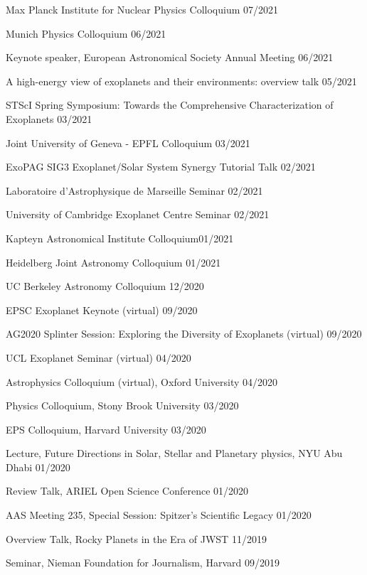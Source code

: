 \documentclass[12pt,letterpaper]{article}
\begin{document}
\begin{list}{}{\cvlist}
\item {Max Planck Institute for Nuclear Physics Colloquium \hfill 07/2021}
\item {Munich Physics Colloquium \hfill 06/2021}
\item {Keynote speaker, European Astronomical Society Annual Meeting \hfill 06/2021}
\item {A high-energy view of exoplanets and their environments: overview talk \hfill 05/2021}
\item {STScI Spring Symposium: Towards the Comprehensive Characterization of Exoplanets \hfill 03/2021}
\item {Joint University of Geneva - EPFL Colloquium \hfill 03/2021}
\item {ExoPAG SIG3 Exoplanet/Solar System Synergy Tutorial Talk \hfill 02/2021}
\item {Laboratoire d'Astrophysique de Marseille Seminar \hfill 02/2021}
\item {University of Cambridge Exoplanet Centre Seminar \hfill 02/2021}
\item {Kapteyn Astronomical Institute Colloquium\hfill 01/2021}
\item {Heidelberg Joint Astronomy Colloquium \hfill 01/2021}
\item {UC Berkeley Astronomy Colloquium \hfill 12/2020}
\item {EPSC Exoplanet Keynote (virtual) \hfill 09/2020}
\item {AG2020 Splinter Session: Exploring the Diversity of Exoplanets (virtual) \hfill 09/2020}
\item {UCL Exoplanet Seminar (virtual) \hfill 04/2020}
\item {Astrophysics Colloquium (virtual), Oxford University \hfill 04/2020}
\item {Physics Colloquium, Stony Brook University \hfill 03/2020}
\item {EPS Colloquium, Harvard University \hfill 03/2020}
\item {Lecture, Future Directions in Solar, Stellar and Planetary physics, NYU Abu Dhabi \hfill 01/2020}
\item {Review Talk, ARIEL Open Science Conference \hfill 01/2020} 
\item {AAS Meeting 235, Special Session: Spitzer's Scientific Legacy \hfill 01/2020}
\item {Overview Talk, Rocky Planets in the Era of JWST \hfill 11/2019}
\item {Seminar, Nieman Foundation for Journalism, Harvard \hfill 09/2019}

\end{list}
\end{document}
